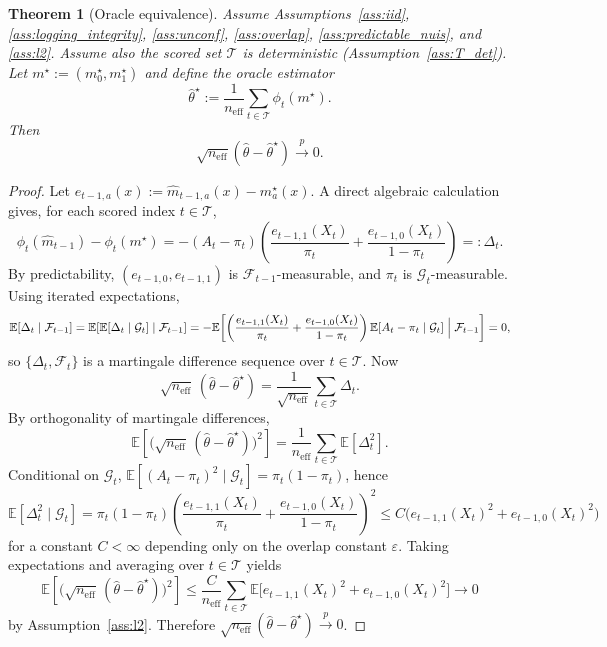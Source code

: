 \documentclass[11pt]{article}
\numberwithin{equation}{section}
\theoremstyle{plain}
\newtheorem{theorem}{Theorem}[section]
\theoremstyle{definition}
\theoremstyle{remark}
\newcommand{\E}{\mathbb{E}}
\newcommand{\cF}{\mathcal{F}}
\newcommand{\cG}{\mathcal{G}}
\newcommand{\pto}{\xrightarrow{p}}
\begin{document}
\begin{theorem}[Oracle equivalence]\label{thm:oracle_equivalence}
Assume Assumptions~\ref{ass:iid}, \ref{ass:logging_integrity}, \ref{ass:unconf}, \ref{ass:overlap}, \ref{ass:predictable_nuis}, and \ref{ass:l2}. Assume also the scored set $\mathcal{T}$ is deterministic (Assumption~\ref{ass:T_det}). Let $m^\star:=(m_0^\star,m_1^\star)$ and define the oracle estimator
\[
\widehat{\theta}^\star := \frac{1}{n_{\mathrm{eff}}}\sum_{t\in\mathcal{T}} \phi_t(m^\star).
\]
Then
\[
\sqrt{n_{\mathrm{eff}}}(\widehat{\theta} - \widehat{\theta}^\star) \pto 0.
\]
\end{theorem}

\begin{proof}
Let $e_{t-1,a}(x):=\widehat m_{t-1,a}(x)-m_a^\star(x)$.
A direct algebraic calculation gives, for each scored index $t\in\mathcal{T}$,
\[
\phi_t(\widehat m_{t-1})-\phi_t(m^\star)
=
-(A_t-\pi_t)\left(\frac{e_{t-1,1}(X_t)}{\pi_t}+\frac{e_{t-1,0}(X_t)}{1-\pi_t}\right)
=:\Delta_t.
\]
By predictability, $(e_{t-1,0},e_{t-1,1})$ is $\cF_{t-1}$-measurable, and $\pi_t$ is $\cG_t$-measurable.
Using iterated expectations,
\[
\E[\Delta_t\mid \cF_{t-1}]
=
\E\!\left[\E[\Delta_t\mid \cG_t]\mid \cF_{t-1}\right]
=
-\E\!\left[\left(\frac{e_{t-1,1}(X_t)}{\pi_t}+\frac{e_{t-1,0}(X_t)}{1-\pi_t}\right)
\E[A_t-\pi_t\mid \cG_t]\Bigm|\cF_{t-1}\right]
=0,
\]
so $\{\Delta_t,\cF_t\}$ is a martingale difference sequence over $t\in\mathcal{T}$.
Now
\[
\sqrt{n_{\mathrm{eff}}}\,(\widehat\theta-\widehat\theta^\star)
=
\frac{1}{\sqrt{n_{\mathrm{eff}}}}\sum_{t\in\mathcal{T}} \Delta_t.
\]
By orthogonality of martingale differences,
\[
\E\!\left[\Big(\sqrt{n_{\mathrm{eff}}}\,(\widehat\theta-\widehat\theta^\star)\Big)^2\right]
=
\frac{1}{n_{\mathrm{eff}}}\sum_{t\in\mathcal{T}}\E[\Delta_t^2].
\]
Conditional on $\cG_t$, $\E[(A_t-\pi_t)^2\mid \cG_t]=\pi_t(1-\pi_t)$, hence
\[
\E[\Delta_t^2\mid \cG_t]
=
\pi_t(1-\pi_t)\left(\frac{e_{t-1,1}(X_t)}{\pi_t}+\frac{e_{t-1,0}(X_t)}{1-\pi_t}\right)^2
\le C\big(e_{t-1,1}(X_t)^2+e_{t-1,0}(X_t)^2\big)
\]
for a constant $C<\infty$ depending only on the overlap constant $\varepsilon$.
Taking expectations and averaging over $t\in\mathcal{T}$ yields
\[
\E\!\left[\Big(\sqrt{n_{\mathrm{eff}}}\,(\widehat\theta-\widehat\theta^\star)\Big)^2\right]
\le
\frac{C}{n_{\mathrm{eff}}}\sum_{t\in\mathcal{T}}
\E\big[e_{t-1,1}(X_t)^2+e_{t-1,0}(X_t)^2\big]
\to 0
\]
by Assumption~\ref{ass:l2}. Therefore $\sqrt{n_{\mathrm{eff}}}(\widehat\theta-\widehat\theta^\star)\pto 0$.
\end{proof}
\end{document}
